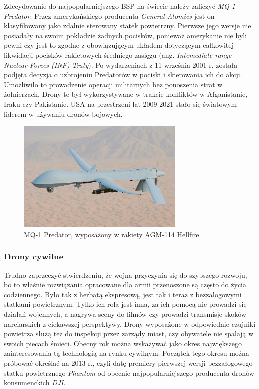 \hspace{1cm}Zdecydowanie do najpopularniejszego BSP na świecie należy zaliczyć \textit{MQ-1 Predator}. Przez amerykańskiego producenta \textit{General Atomics} jest on klasyfikowany jako zdalnie sterowany statek powietrzny. Pierwsze jego wersje nie posiadały na swoim pokładzie żadnych pocisków, ponieważ amerykanie nie byli pewni czy jest to zgodne z obowiązującym układem dotyczącym całkowitej likwidacji pocisków rakietowych średniego zasięgu (ang. \textit{Intemediate-range Nuclear Forces (INF) Traty}). Po wydarzeniach z 11 września 2001 r. została podjęta decyzja o uzbrojeniu Predatorów w pociski i skierowania ich do akcji. Umożliwiło to prowadzenie operacji militarnych bez ponoszenia strat w żołnierzach. Drony te był wykorzystywane w trakcie konfliktów w Afganistanie, Iraku czy Pakistanie. USA na przestrzeni lat 2009-2021 stało się światowym liderem w używaniu dronów bojowych. \cite{dron-ibuk}\cite{predator-wiki} 


\begin{figure}[!ht]
  \centering
  \includegraphics[width=8cm]{./Obrazy/predator.jpg}
  \caption{MQ-1 Predator, wyposażony w rakiety AGM-114 Hellfire}
  \end{figure}

\subsubsection{Drony cywilne}
\hspace{1cm}Trudno zaprzeczyć stwierdzeniu, że wojna przyczynia się do szybszego rozwoju, bo to właśnie rozwiązania opracowane dla armii przenoszone są często do życia codziennego. Było tak z herbatą ekspresową, jest tak i teraz z bezzałogowymi statkami powietrznym. Tylko ich rola jest inna, za ich pomocą nie prowadzi się działań wojennych, a nagrywa sceny do filmów czy prowadzi transmisje skoków narciarskich z ciekawszej perspektywy. Drony wyposażone w odpowiednie czujniki powietrza służą też do inspekcji przez zarządy miast, czy obywatele nie spalają w swoich piecach śmieci. Obecny rok można wskazywać jako okres największego zainteresowania tą technologią na rynku cywilnym. Początek tego okresu można próbować określać na 2013 r., czyli datę premiery pierwszej wersji bezzałogowego statku powietrznego \textit{Phantom} od obecnie najpopularniejszego producenta dronów konsumenckich \textit{DJI}.   

